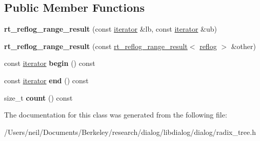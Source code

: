\subsection*{Public Member Functions}
\begin{DoxyCompactItemize}
\item 
\mbox{\label{classdialog_1_1index_1_1rt__reflog__range__result_ad0cd50fa04e967b70fcdde65256ae690}} 
{\bfseries rt\+\_\+reflog\+\_\+range\+\_\+result} (const \hyperlink{classdialog_1_1index_1_1rt__reflog__it}{iterator} \&lb, const \hyperlink{classdialog_1_1index_1_1rt__reflog__it}{iterator} \&ub)
\item 
\mbox{\label{classdialog_1_1index_1_1rt__reflog__range__result_a728cbbb489e31bd295f5bd4b23654895}} 
{\bfseries rt\+\_\+reflog\+\_\+range\+\_\+result} (const \hyperlink{classdialog_1_1index_1_1rt__reflog__range__result}{rt\+\_\+reflog\+\_\+range\+\_\+result}$<$ \hyperlink{classdialog_1_1monolog_1_1monolog__exp2__linear}{reflog} $>$ \&other)
\item 
\mbox{\label{classdialog_1_1index_1_1rt__reflog__range__result_afc9ea803ceeee0a2afe6c3016b45652a}} 
const \hyperlink{classdialog_1_1index_1_1rt__reflog__it}{iterator} {\bfseries begin} () const
\item 
\mbox{\label{classdialog_1_1index_1_1rt__reflog__range__result_aa7ddf70c41c65711da0e4dd2ac87130e}} 
const \hyperlink{classdialog_1_1index_1_1rt__reflog__it}{iterator} {\bfseries end} () const
\item 
\mbox{\label{classdialog_1_1index_1_1rt__reflog__range__result_a9a47bc9b87d6d91e2247ba78bf8a4051}} 
size\+\_\+t {\bfseries count} () const
\end{DoxyCompactItemize}


The documentation for this class was generated from the following file\+:\begin{DoxyCompactItemize}
\item 
/\+Users/neil/\+Documents/\+Berkeley/research/dialog/libdialog/dialog/radix\+\_\+tree.\+h\end{DoxyCompactItemize}
